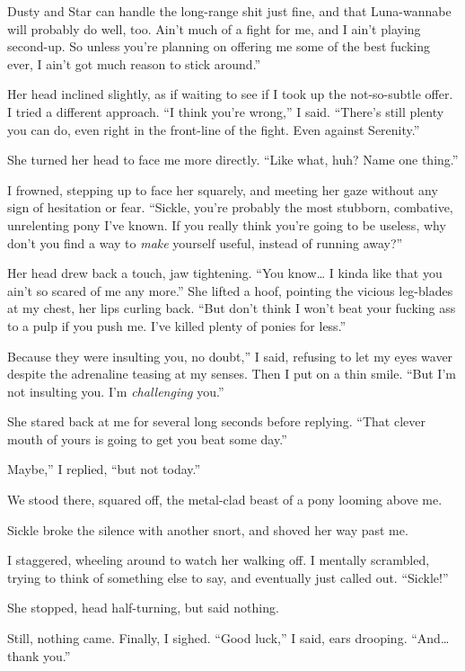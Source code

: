 \leavevmode{}Dusty and Star can handle the long-range shit just fine, and that Luna-wannabe will probably do well, too. Ain’t much of a fight for me, and I ain’t playing second-up. So unless you’re planning on offering me some of the best fucking ever, I ain’t got much reason to stick around.”

Her head inclined slightly, as if waiting to see if I took up the not-so-subtle offer. I tried a different approach. “I think you’re wrong,” I said. “There’s still plenty you can do, even right in the front-line of the fight. Even against Serenity.”

She turned her head to face me more directly. “Like what, huh? Name one thing.”

I frowned, stepping up to face her squarely, and meeting her gaze without any sign of hesitation or fear. “Sickle, you’re probably the most stubborn, combative, unrelenting pony I’ve known. If you really think you’re going to be useless, why don’t you find a way to \textit{make} yourself useful, instead of running away?”

Her head drew back a touch, jaw tightening. “You know… I kinda like that you ain’t so scared of me any more.” She lifted a hoof, pointing the vicious leg-blades at my chest, her lips curling back. “But don’t think I won’t beat your fucking ass to a pulp if you push me. I’ve killed plenty of ponies for less.”

\leavevmode{}Because they were insulting you, no doubt,” I said, refusing to let my eyes waver despite the adrenaline teasing at my senses. Then I put on a thin smile. “But I’m not insulting you. I’m \textit{challenging} you.”

She stared back at me for several long seconds before replying. “That clever mouth of yours is going to get you beat some day.”

\leavevmode{}Maybe,” I replied, “but not today.”

We stood there, squared off, the metal-clad beast of a pony looming above me.

Sickle broke the silence with another snort, and shoved her way past me.

I staggered, wheeling around to watch her walking off. I mentally scrambled, trying to think of something else to say, and eventually just called out. “Sickle!”

She stopped, head half-turning, but said nothing.

Still, nothing came. Finally, I sighed. “Good luck,” I said, ears drooping. “And… thank you.”

